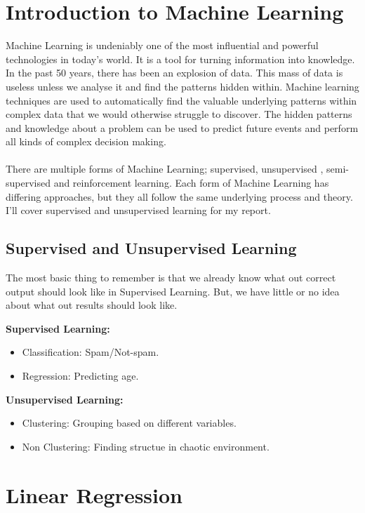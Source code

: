 \documentclass[12pt]{report}
\begin{document}
\tableofcontents

\chapter{Introduction to Machine Learning}

Machine Learning is undeniably one of the most influential and powerful technologies in today’s world. It is a tool for turning information into knowledge. In the past 50 years, there has been an explosion of data. This mass of data is useless unless we analyse it and find the patterns hidden within. Machine learning techniques are used to automatically find the valuable underlying patterns within complex data that we would otherwise struggle to discover. The hidden patterns and knowledge about a problem can be used to predict future events and perform all kinds of complex decision making.\\\\
There are multiple forms of Machine Learning; supervised, unsupervised , semi-supervised and reinforcement learning. Each form of Machine Learning has differing approaches, but they all follow the same underlying process and theory. I'll cover supervised and unsupervised learning for my report.


\section{Supervised and Unsupervised Learning}
  The most basic thing to remember is that we already know what out correct output should look like in Supervised Learning.
  But, we have little or no idea about what out results should look like.

  \textbf{Supervised Learning:}
  \begin{itemize}
    \item Classification: Spam/Not-spam. 
    \item Regression: Predicting age.
  \end{itemize}

  \textbf{Unsupervised Learning:}
  \begin{itemize}
    \item Clustering: Grouping based on different variables.
    \item Non Clustering: Finding structue in chaotic environment.
  \end{itemize}


\chapter{Linear Regression}
\end{document}
